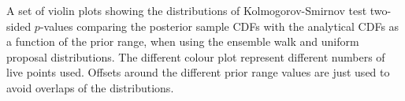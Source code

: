 \label{fig:walkunipropks}
A set of violin plots showing the distributions of Kolmogorov-Smirnov test
two-sided $p$-values comparing the posterior sample CDFs with the analytical
CDFs as a function of the prior range, when using the ensemble walk and uniform proposal distributions. The different colour plot represent different numbers of live points used.
Offsets around the different prior range values are just used to avoid overlaps of the
distributions.
